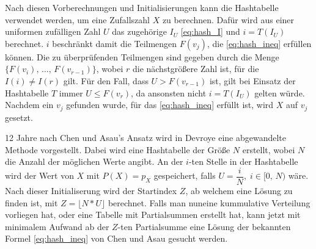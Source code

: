 Nach diesen Vorberechnungen und Initialisierungen kann die Hashtabelle verwendet 
werden, um eine Zufallszahl $X$ zu berechnen. Dafür wird aus einer uniformen 
zufälligen Zahl $U$ das zugehörige $I_U$ \eqref{eq:hash_I} und $i = T(I_U)$ berechnet. $i$ 
beschränkt damit die Teilmengen $F(v_j)$, die \eqref{eq:hash_ineq} erfüllen 
können. Die zu überprüfenden Teilmengen sind gegeben durch die Menge $\{F(v_i),\, \dots,
\, F(v_{r-1})\}$, wobei $r$ die nächstgrößere Zahl ist, für die $I(i) \neq I(r)$ 
gilt. Für den Fall, dass $U > F(v_{r-1})$ ist, gilt bei Einsatz der Hashtabelle 
$T$ immer $U \leq F(v_r)$, da ansonsten nicht $i = T(I_U)$ gelten würde. Nachdem 
ein $v_j$ gefunden wurde, für das \eqref{eq:hash_ineq} erfüllt ist, wird $X$ auf 
$v_j$ gesetzt.

12 Jahre nach Chen und Asau's Ansatz wird in Devroye 
\cite{devroye-non_uniform_random_variate-1986} eine abgewandelte Methode 
vorgestellt. Dabei wird eine Hashtabelle der Größe $N$ erstellt, wobei $N$ die 
Anzahl der möglichen Werte angibt. An der $i$-ten Stelle in der Hashtabelle wird 
der Wert von $X$ mit $P(X) = p_X$ gespeichert, falls $U = \dfrac{i}{N},\; i \in 
[0,\, N)$ wäre. Nach dieser Initialiserung wird der Startindex $Z$, ab welchem 
eine Lösung zu finden ist, mit $Z = \lfloor N * U \rfloor$ berechnet. Falls man 
nuneine kummulative Verteilung vorliegen hat, oder eine Tabelle mit Partialsummen 
erstellt hat, kann jetzt mit minimalem Aufwand ab der $Z$-ten Partialsumme eine 
Lösung der bekannten Formel \eqref{eq:hash_ineq} von Chen und Asau gesucht werden.
